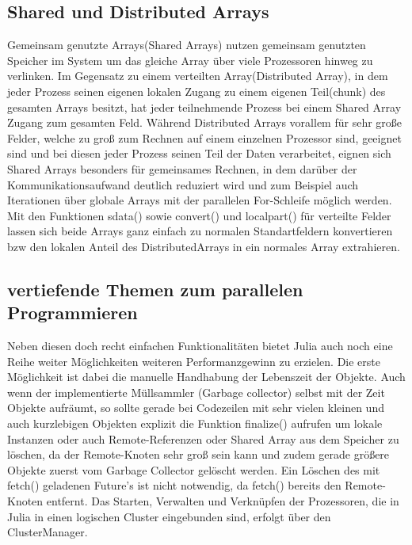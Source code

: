 \documentclass[proseminar,german,utf8]{zihpub}
\begin{document}
\subsection{Shared und Distributed Arrays}

Gemeinsam genutzte Arrays(Shared Arrays) nutzen gemeinsam genutzten Speicher im System um das gleiche Array über viele Prozessoren hinweg zu verlinken. Im Gegensatz zu einem verteilten Array(Distributed Array), in dem jeder Prozess seinen eigenen lokalen Zugang zu einem eigenen Teil(chunk) des gesamten Arrays besitzt, hat jeder teilnehmende Prozess bei einem Shared Array Zugang zum gesamten Feld. Während Distributed Arrays vorallem für sehr große Felder, welche zu groß zum Rechnen auf einem einzelnen Prozessor sind, geeignet sind und bei diesen jeder Prozess seinen Teil der Daten verarbeitet, eignen sich Shared Arrays besonders für gemeinsames Rechnen, in dem darüber der Kommunikationsaufwand deutlich reduziert wird und zum Beispiel auch Iterationen über globale Arrays mit der parallelen For-Schleife möglich werden. Mit den Funktionen sdata() sowie convert() und localpart() für verteilte Felder lassen sich beide Arrays ganz einfach zu normalen Standartfeldern konvertieren bzw den lokalen Anteil des DistributedArrays in ein normales Array extrahieren. 

\subsection{vertiefende Themen zum parallelen Programmieren}

Neben diesen doch recht einfachen Funktionalitäten bietet Julia auch noch eine Reihe weiter Möglichkeiten weiteren Performanzgewinn zu erzielen. Die erste Möglichkeit ist dabei die manuelle Handhabung der Lebenszeit der Objekte. Auch wenn der implementierte Müllsammler (Garbage collector) selbst mit der Zeit Objekte aufräumt, so sollte gerade bei Codezeilen mit sehr vielen kleinen und auch kurzlebigen Objekten explizit die Funktion finalize() aufrufen um lokale Instanzen oder auch Remote-Referenzen oder Shared Array aus dem Speicher zu löschen, da der Remote-Knoten sehr groß sein kann und zudem gerade größere Objekte zuerst vom Garbage Collector gelöscht werden. Ein Löschen des mit fetch() geladenen Future's ist nicht notwendig, da fetch() bereits den Remote-Knoten entfernt. Das Starten, Verwalten und Verknüpfen der Prozessoren, die in Julia in einen logischen Cluster eingebunden sind, erfolgt über den ClusterManager.
\end{document}
